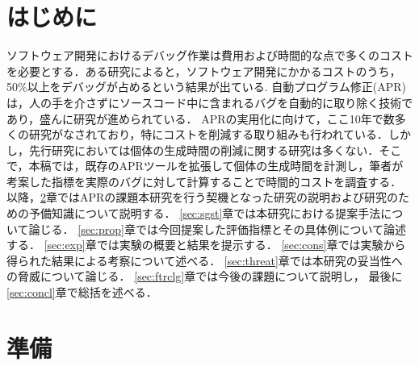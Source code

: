 \documentclass[uplatex,dvipdfmx,a4paper]{jsarticle}
\let\oldcite\cite
\renewcommand{\cite}[1]{\xspace\oldcite{#1}}
\begin{document}
\section{はじめに}\label{sec:intro}
ソフトウェア開発におけるデバッグ作業は費用および時間的な点で多くのコストを必要とする．ある研究によると，ソフトウェア開発にかかるコストのうち，50\%以上をデバッグが占めるという結果が出ている\cite{5386906, Britton_reversibledebugging}.
自動プログラム修正(APR)は，人の手を介さずにソースコード中に含まれるバグを自動的に取り除く技術であり，盛んに研究が進められている\cite{gazzola2018automatic, goues2019automated}．
APRの実用化に向けて，ここ10年で数多くの研究がなされており，特にコストを削減する取り組みも行われている\cite{id692,qi2013efficient}．しかし，先行研究においては個体の生成時間の削減に関する研究は多くない．そこで，本稿では，既存のAPRツールを拡張して個体の生成時間を計測し，筆者が考案した指標を実際のバグに対して計算することで時間的コストを調査する．\\
以降，\ref{sec:prep}章ではAPRの課題本研究を行う契機となった研究の説明および研究のための予備知識について説明する．
\ref{sec:sgst}章では本研究における提案手法について論じる．
\ref{sec:prop}章では今回提案した評価指標とその具体例について論述する．
\ref{sec:exp}章では実験の概要と結果を提示する．
\ref{sec:cons}章では実験から得られた結果による考察について述べる．
\ref{sec:threat}章では本研究の妥当性への脅威について論じる．
\ref{sec:ftrclg}章では今後の課題について説明し，
最後に\ref{sec:concl}章で総括を述べる．

\clearpage
\section{準備}\label{sec:prep}
\end{document}
